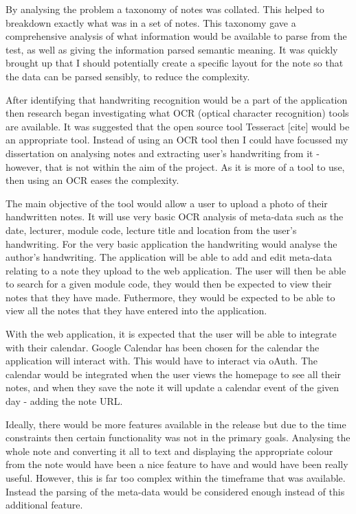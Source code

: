 By analysing the problem a taxonomy of notes was collated. This helped to breakdown exactly what was in a set of notes. This taxonomy gave a comprehensive analysis of what information would be available to parse from the test, as well as giving the information parsed semantic meaning. It was quickly brought up that I should potentially create a specific layout for the note so that the data can be parsed sensibly, to reduce the complexity.

After identifying that handwriting recognition would be a part of the application then research began investigating what OCR (optical character recognition) tools are available. It was suggested that the open source tool Tesseract [cite] would be an appropriate tool. Instead of using an OCR tool then I could have focussed my dissertation on analysing notes and extracting user's handwriting from it - however, that is not within the aim of the project. As it is more of a tool to use, then using an OCR eases the complexity.

The main objective of the tool would allow a user to upload a photo of their handwritten notes. It will use very basic OCR analysis of meta-data such as the date, lecturer, module code, lecture title and location from the user's handwriting. For the very basic application the handwriting would analyse the author's handwriting. The application will be able to add and edit meta-data relating to a note they upload to the web application. The user will then be able to search for a given module code, they would then be expected to view their notes that they have made. Futhermore, they would be expected to be able to view all the notes that they have entered into the application.

With the web application, it is expected that the user will be able to integrate with their calendar. Google Calendar has been chosen for the calendar the application will interact with. This would have to interact via oAuth. The calendar would be integrated when the user views the homepage to see all their notes, and when they save the note it will update a calendar event of the given day - adding the note URL.

Ideally, there would be more features available in the release but due to the time constraints then certain functionality was not in the primary goals. Analysing the whole note and converting it all to text and displaying the appropriate colour from the note would have been a nice feature to have and would have been really useful. However, this is far too complex within the timeframe that was available. Instead the parsing of the meta-data would be considered enough instead of this additional feature.

